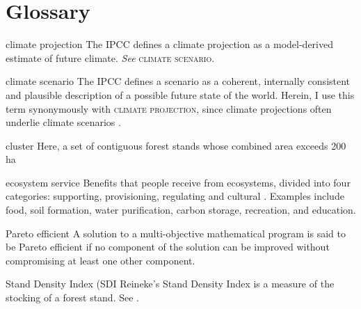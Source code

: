 
\chapter*{Glossary}      %
\thispagestyle{plain}
%
\begin{glossary}

\item[climate projection] The IPCC defines a climate projection as a model-derived estimate of future climate. \textit{See} \textsc{climate scenario}\cite{ipcc2013Definition}.

\item[climate scenario] The IPCC defines a scenario as a coherent, internally consistent and plausible description of a possible future state of the world. Herein, I use this term synonymously with \textsc{climate projection}, since climate projections often underlie climate scenarios \cite{ipcc2013Definition}.

\item[cluster] Here, a set of contiguous forest stands whose combined area exceeds 200 ha

\item[ecosystem service] Benefits that people receive from ecosystems, divided into four categories: supporting, provisioning, regulating and cultural \cite{assessment2005ecosystems}. Examples include food, soil formation, water purification, carbon storage, recreation, and education.

\item[Pareto efficient] A solution to a multi-objective mathematical program is said to be Pareto efficient if no component of the solution can be improved without compromising at least one other component.

\item[Stand Density Index (SDI] Reineke's Stand Density Index is a measure of the stocking of a forest stand. See \cite{reineke1933perfecting}.
 
\end{glossary}